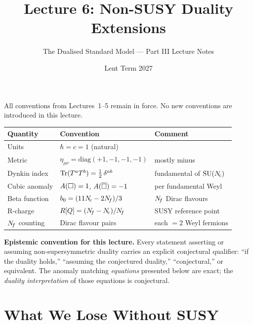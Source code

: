 \documentclass[11pt,a4paper]{article}
\title{\textbf{Lecture 6: Non-SUSY Duality Extensions}}
\author{The Dualised Standard Model --- Part III Lecture Notes}
\date{Lent Term 2027}
\begin{document}
\maketitle

\tableofcontents
\newpage


\begin{conventionbox}[title={Conventions for Lecture 6}]
All conventions from Lectures~1--5 remain in force.  No new conventions
are introduced in this lecture.

\renewcommand{\arraystretch}{1.3}
\begin{tabular}{@{}l l l@{}}
\toprule
\textbf{Quantity} & \textbf{Convention} & \textbf{Comment} \\
\midrule
Units & $\hbar = c = 1$ (natural) & \\
Metric & $\eta_{\mu\nu} = \mathrm{diag}(+1,-1,-1,-1)$ & mostly minus \\
Dynkin index & $\mathrm{Tr}(T^a T^b) = \tfrac{1}{2}\, \delta^{ab}$ & fundamental of $\mathrm{SU}(N_{\!c})$ \\
Cubic anomaly & $A(\square) = 1$, $A(\overline{\square}) = -1$ & per fundamental Weyl \\
Beta function & $b_0 = (11N_{\!c} - 2N_{\!f})/3$ & $N_{\!f}$ Dirac flavours \\
R-charge & $R[Q] = (N_{\!f} - N_{\!c})/N_{\!f}$ & SUSY reference point \\
$N_{\!f}$ counting & Dirac flavour pairs & each $= 2$ Weyl fermions \\
\bottomrule
\end{tabular}

\medskip

\textbf{Epistemic convention for this lecture.}  Every statement
asserting or assuming non-supersymmetric duality carries an explicit
conjectural qualifier: ``if the duality holds,'' ``assuming the
conjectured duality,'' ``conjectural,'' or equivalent.  The anomaly
matching \emph{equations} presented below are exact; the
\emph{duality interpretation} of those equations is conjectural.
\end{conventionbox}


\section{What We Lose Without SUSY}
\label{sec:what-we-lose}
\end{document}
